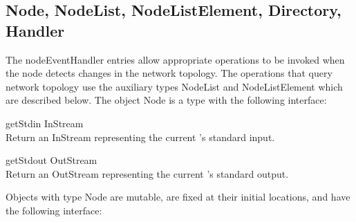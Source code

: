 \subsection{Node, NodeList, NodeListElement, Directory, Handler}
\label{builtin Node}
The nodeEventHandler entries allow appropriate operations to be
invoked when the node detects changes in the network topology.  The
operations that query network topology use the auxiliary types
NodeList and NodeListElement which are described below.
The object Node is a type with the following interface:

\begin{desc}
  \item[\kw{operation} getStdin \returns{} \/\LB{}InStream\/\RB{}]~\\
    Return an InStream representing the current 's standard input.
  \item[\kw{operation} getStdout \returns{} \/\LB{}OutStream\/\RB{}]~\\
    Return an OutStream representing the current 's standard output.
\end{desc}

\noindent Objects with type Node are mutable, are fixed at their initial
locations, and have the following interface:

